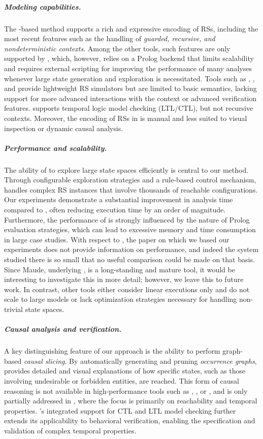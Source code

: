 \subparagraph*{Modeling capabilities.}
The \GROOVE-based method supports a rich and expressive encoding of RSs, including the most recent features such as the handling of \emph{guarded, recursive, and nondeterministic contexts}.
Among the other tools, such features are only supported by \BioResolve, which, however, relies on a Prolog backend that limits scalability and requires external scripting for improving the performance of many analyses whenever large state generation and exploration is necessitated. Tools such as \HERESY, \WebRSim, and \clrs provide lightweight RS simulators but are limited to basic semantics, lacking support for more advanced interactions with the context or advanced verification features. \ccReact supports temporal logic model checking (LTL/CTL), but not recursive contexts. Moreover, the encoding of RSs in \ccReact is manual and less suited to visual inspection or dynamic causal analysis.

\subparagraph*{Performance and scalability.}
The ability of \GROOVE to explore large state spaces efficiently is central to our method. Through configurable exploration strategies and a rule-based control mechanism, \GROOVE handles complex RS instances that involve thousands of reachable configurations. Our experiments demonstrate a substantial improvement in analysis time compared to \BioResolve, often reducing execution time by an order of magnitude. Furthermore, the performance of \BioResolve is strongly influenced by the nature of Prolog evaluation strategies, which can lead to excessive memory and time consumption in large case studies. With respect to \ccReact, the paper \cite{DBLP:conf/cmsb/BallisBFO24} on which we based our experiments does not provide information on performance, and indeed the system studied there is so small that no useful comparison could be made on that basis. Since Maude, underlying \ccReact, is a long-standing and mature tool, it would be interesting to investigate this in more detail; however, we leave this to future work.
In contrast, other tools either consider linear executions only and do not scale to large models or lack optimization strategies necessary for handling non-trivial state spaces. 

\subparagraph*{Causal analysis and verification.}
A key distinguishing feature of our approach is the ability to perform graph-based \emph{causal slicing}. By automatically generating and pruning \emph{occurrence graphs}, \GROOVE provides detailed and visual explanations of how specific states, such as those involving undesirable or forbidden entities, are reached.
This form of causal reasoning is not available in high-performance tools such as \HERESY, \WebRSim, or \clrs, and is only partially addressed in \ccReact, where the focus is primarily on reachability and temporal properties. 
\GROOVE's integrated support for CTL and LTL model checking further extends its applicability to behavioral verification, enabling the specification and validation of complex temporal properties. 

